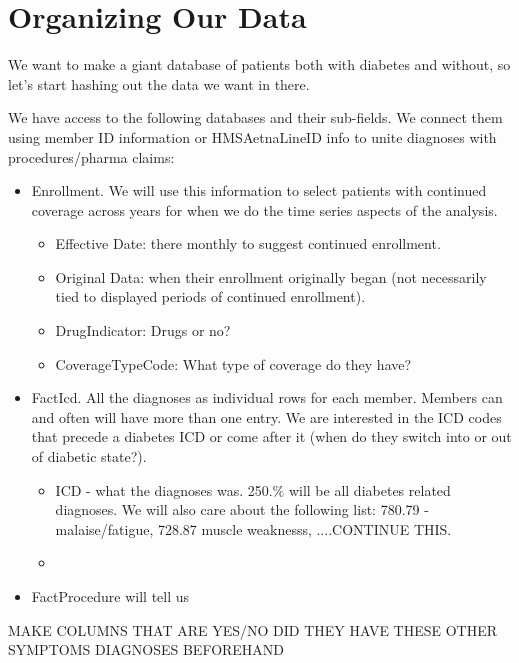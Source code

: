 \documentclass{article}
\begin{document}
\section{Organizing Our Data}

We want to make a giant database of patients both with diabetes and without, so let's start hashing out the data we want in there.

We have access to the following databases and their sub-fields. We connect them using member ID information or HMSAetnaLineID info to unite diagnoses with procedures/pharma claims:
\begin{itemize}
\item Enrollment. We will use this information to select patients with continued coverage across years for when we do the time series aspects of the analysis.
\begin{itemize}
\item Effective Date: there monthly to suggest continued enrollment. 
\item Original Data: when their enrollment originally began (not necessarily tied to displayed periods of continued enrollment).
\item  DrugIndicator: Drugs or no?
\item CoverageTypeCode: What type of coverage do they have?
\end{itemize}

\item FactIcd. All the diagnoses as individual rows for each member. Members can and often will have more than one entry. We are interested in the ICD codes that precede a diabetes ICD or come after it (when do they switch into or out of diabetic state?). 
\begin{itemize}
\item ICD - what the diagnoses was. 250.$\%$ will be all diabetes related diagnoses. We will also care about the following list: 780.79 -malaise/fatigue, 728.87 muscle weaknesss, ....CONTINUE THIS.
\item 
\end{itemize}
\item FactProcedure will tell us 
\end{itemize}

MAKE COLUMNS THAT ARE YES/NO DID THEY HAVE THESE OTHER SYMPTOMS DIAGNOSES BEFOREHAND
\end{document}

